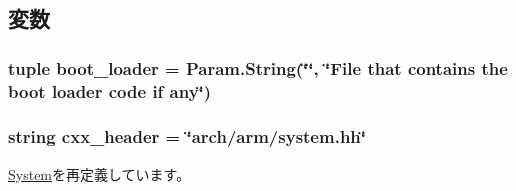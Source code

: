 \subsection{変数}
\hypertarget{classArmSystem_1_1ArmSystem_a241024b500742afa82dcb8edf653cd4c}{
\subsubsection[{boot\_\-loader}]{\setlength{\rightskip}{0pt plus 5cm}tuple boot\_\-loader = Param.String(\char`\"{}\char`\"{}, \char`\"{}File that contains the boot loader code if any\char`\"{})}}
\label{classArmSystem_1_1ArmSystem_a241024b500742afa82dcb8edf653cd4c}
\hypertarget{classArmSystem_1_1ArmSystem_a17da7064bc5c518791f0c891eff05fda}{
\subsubsection[{cxx\_\-header}]{\setlength{\rightskip}{0pt plus 5cm}string cxx\_\-header = \char`\"{}arch/arm/system.hh\char`\"{}}}
\label{classArmSystem_1_1ArmSystem_a17da7064bc5c518791f0c891eff05fda}


\hyperlink{classSystem_1_1System_a17da7064bc5c518791f0c891eff05fda}{System}を再定義しています。

